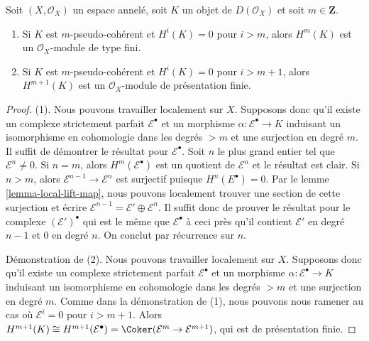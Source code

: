 \begin{lemma}

\label{lemma-finite-cohomology}

Soit $(X, \mathcal{O}_X)$ un espace annelé, soit $K$ un objet de $D(\mathcal{O}_X)$ et soit $m \in \mathbf{Z}$.

\begin{enumerate}

\item Si $K$ est $m$-pseudo-cohérent et $H^i(K) = 0$
pour $i > m$, alors $H^m(K)$ est un $\mathcal{O}_X$-module de type fini.
\item Si $K$ est $m$-pseudo-cohérent et $H^i(K) = 0$
pour $i > m + 1$, alors $H^{m + 1}(K)$ est un
$\mathcal{O}_X$-module de présentation finie.

\end{enumerate}

\end{lemma}

\begin{proof}

(1). Nous pouvons travailler localement sur $X$. Supposons donc qu'il existe un complexe strictement parfait $\mathcal{E}^\bullet$ et un morphisme
$\alpha : \mathcal{E}^\bullet \to K$ induisant un isomorphisme en cohomologie dans les degrés $> m$ et une surjection en degré $m$. Il suffit de démontrer le résultat pour $\mathcal{E}^\bullet$. Soit $n$ le plus grand entier tel que $\mathcal{E}^n \not = 0$. Si $n = m$, alors $H^m(\mathcal{E}^\bullet)$ est un quotient de
$\mathcal{E}^n$ et le résultat est clair. Si $n > m$, alors $\mathcal{E}^{n - 1} \to \mathcal{E}^n$ est surjectif puisque
$H^n(E^\bullet) = 0$. Par le lemme \ref{lemma-local-lift-map},
nous pouvons localement trouver une section de cette surjection et écrire
$\mathcal{E}^{n - 1} = \mathcal{E}' \oplus \mathcal{E}^n$. Il suffit donc de prouver le résultat pour le complexe
$(\mathcal{E}')^\bullet$ qui est le même que $\mathcal{E}^\bullet$
à ceci près qu'il contient $\mathcal{E}'$ en degré $n - 1$ et $0$ en degré $n$. On conclut par récurrence sur $n$.

\medskip\noindent
Démonstration de (2). Nous pouvons travailler localement sur $X$. Supposons donc qu'il existe un complexe strictement parfait $\mathcal{E}^\bullet$ et un morphisme $\alpha : \mathcal{E}^\bullet \to K$ induisant un isomorphisme en cohomologie dans les degrés $> m$ et une surjection en degré $m$. Comme dans la démonstration de (1), nous pouvons nous ramener au cas où $\mathcal{E}^i = 0$ pour $i > m + 1$. Alors $H^{m + 1}(K) \cong H^{m + 1}(\mathcal{E}^\bullet) =
\Coker(\mathcal{E}^m \to \mathcal{E}^{m + 1})$, qui est de présentation finie.
\end{proof}

